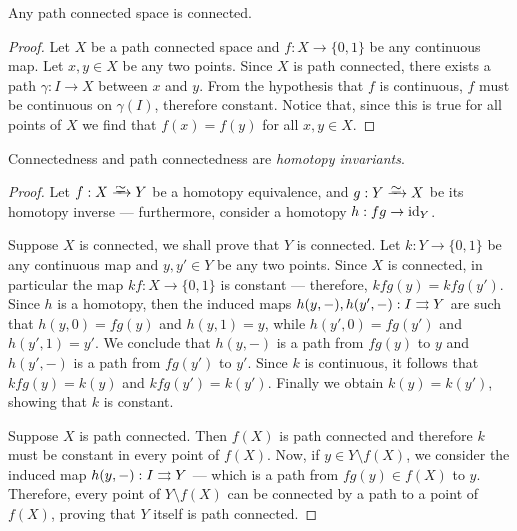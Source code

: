 \begin{proposition}
\label{prop:path-connected-is-connected}
Any path connected space is connected.
\end{proposition}

\begin{proof}
Let \(X\) be a path connected space and \(f: X \to \{0, 1\}\) be any continuous
map. Let \(x, y \in X\) be any two points. Since \(X\) is path connected, there
exists a path \(\gamma: I \to X\) between \(x\) and \(y\). From the hypothesis
that \(f\) is continuous, \(f\) must be continuous on \(\gamma(I)\), therefore
constant. Notice that, since this is true for all points of \(X\) we find that
\(f(x) = f(y)\) for all \(x, y \in X\).
\end{proof}

\begin{proposition}
\label{prop:path-conn-htpy-invariant}
Connectedness and path connectedness are \emph{homotopy invariants}.
\end{proposition}

\begin{proof}
Let \(f: X \isoto Y\) be a homotopy equivalence, and \(g: Y \isoto X\) be its
homotopy inverse --- furthermore, consider a homotopy \(h: fg \to \operatorname{id}_Y\).

Suppose \(X\) is connected, we shall prove that \(Y\) is connected. Let
\(k: Y \to \{0, 1\}\) be any continuous map and \(y, y' \in Y\) be any two
points. Since \(X\) is connected, in particular the map \(k f: X \to \{0, 1\}\)
is constant --- therefore, \(k f g(y) = k f g(y')\). Since \(h\) is a homotopy,
then the induced maps \(h(y, -), h(y', -): I \rightrightarrows Y\) are such that
\(h(y, 0) = f g(y)\) and \(h(y, 1) = y\), while \(h(y', 0) = f g(y')\) and
\(h(y', 1) = y'\). We conclude that \(h(y, -)\) is a path from \(fg(y)\) to
\(y\) and \(h(y', -)\) is a path from \(fg(y')\) to \(y'\). Since \(k\) is
continuous, it follows that \(k f g(y) = k(y)\) and \(kfg(y') = k(y')\). Finally
we obtain \(k(y) = k(y')\), showing that \(k\) is constant.

Suppose \(X\) is path connected. Then \(f(X)\) is path connected and therefore
\(k\) must be constant in every point of \(f(X)\). Now, if
\(y \in Y \setminus f(X)\), we consider the induced map \(h(y, -): I \rightrightarrows Y\)
--- which is a path from \(fg(y) \in f(X)\) to \(y\). Therefore, every point of
\(Y \setminus f(X)\) can be connected by a path to a point of \(f(X)\), proving
that \(Y\) itself is path connected.
\end{proof}

